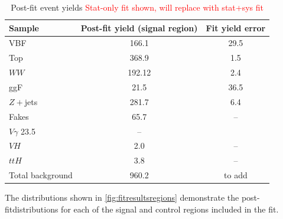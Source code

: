 \begin{table}[!h]
  \begin{center}
    \begin{tabular}{l|c|c|}
      Sample   & Post-fit yield (signal region) & Fit yield error \\
      \hline
      VBF   &   166.1 & 29.5 \\
      Top   &  368.9 & 1.5 \\
      $WW$ & 192.12 & 2.4 \\
      ggF &  21.5 & 36.5 \\
      $Z+$jets & 281.7 & 6.4 \\
      Fakes &  65.7 & -- \\
      $V\gamma$ 23.5 & -- \\
      $VH$ & 2.0 & -- \\
      $ttH$ & 3.8 & -- \\
      Total background & 960.2 &to add \\
      \hline
    \end{tabular}
    \caption{Post-fit event yields \textcolor{red}{Stat-only fit shown, will replace with stat+sys fit}}
    \label{tab:postfityields}
  \end{center}
\end{table}

The distributions shown in \ref{fig:fitresultsregions} demonstrate the post-fitdistributions for each of the signal and control regions included in the fit. 

